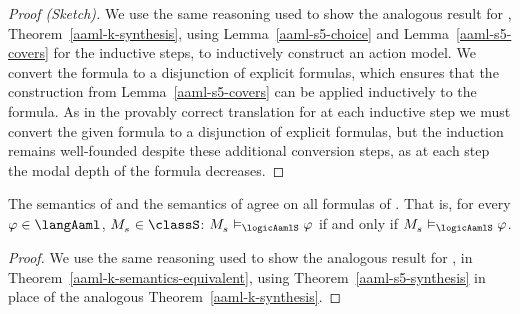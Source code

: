 \begin{proof}[Proof (Sketch)]
We use the same reasoning used to show the analogous result for \logicAamlK{}, Theorem~\ref{aaml-k-synthesis}, using Lemma~\ref{aaml-s5-choice} and Lemma~\ref{aaml-s5-covers} for the inductive steps, to inductively construct an action model.
We convert the formula to a disjunction of explicit formulas, which ensures that the construction from Lemma~\ref{aaml-s5-covers} can be applied inductively to the formula.
As in the provably correct translation for \logicRmlS{} at each inductive step we must convert the given formula to a disjunction of explicit formulas, but the induction remains well-founded despite these additional conversion steps, as at each step the modal depth of the formula decreases.
\end{proof}

\begin{theorem}\label{aaml-s5-semantics-equivalent}
The semantics of \logicAamlS{} and the semantics of \logicRamlS{} agree on all formulas of \langAaml{}.
That is, for every $\phi \in \langAaml$, $\kPModel{\kStateS} \in \classS$: $\kPModel{\kStateS} \entails_\logicAamlS \phi$ if and only if $\kPModel{\kStateS} \entails_\logicAamlS \phi$.
\end{theorem}

\begin{proof}
We use the same reasoning used to show the analogous result for \logicAamlK{}, in Theorem~\ref{aaml-k-semantics-equivalent}, using Theorem~\ref{aaml-s5-synthesis} in place of the analogous Theorem~\ref{aaml-k-synthesis}.
\end{proof}
